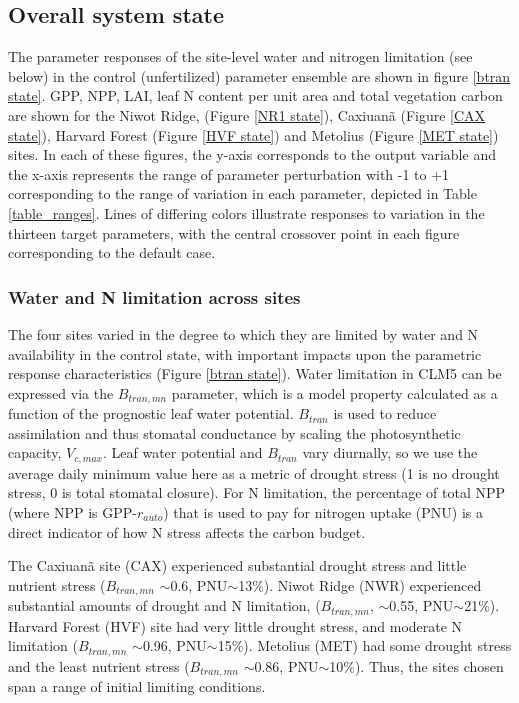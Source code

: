 \documentclass[draft,linenumbers]{agujournal}
\begin{document}
\subsection{Overall system state}
The parameter responses of the site-level water and nitrogen limitation (see below) in the control (unfertilized) parameter ensemble are shown in figure \ref{btran state}. GPP, NPP, LAI, leaf N content per unit area and total vegetation carbon are shown for the Niwot Ridge, (Figure \ref{NR1 state}), Caxiuan\~a (Figure \ref{CAX state}), Harvard Forest (Figure \ref{HVF state}) and Metolius (Figure \ref{MET state}) sites. In each of these figures, the y-axis corresponds to the output variable and the x-axis represents the range of parameter perturbation with -1 to +1 corresponding to the range of variation in each parameter, depicted in Table \ref{table_ranges}. Lines of differing colors illustrate responses to variation in the thirteen target parameters, with the central crossover point in each figure corresponding to the default case.

\subsubsection{Water and N limitation across sites}
The four sites varied in the degree to which they are limited by water and N availability in the control state, with important impacts upon the parametric response characteristics (Figure \ref{btran state}). Water limitation in CLM5 can be expressed via the $B_{tran,mn}$ parameter, which is a model property calculated as a function of the prognostic leaf water potential. $B_{tran}$  is used to reduce assimilation and thus stomatal conductance by scaling the photosynthetic capacity, $V_{c,max}$. Leaf water potential and  $B_{tran}$ vary diurnally, so we use the average daily minimum value here as a metric of drought stress (1 is no drought stress, 0 is total stomatal closure). For N limitation, the percentage of total NPP (where NPP is GPP-$r_{auto}$) that is used to pay for nitrogen uptake (PNU) is a direct indicator of how N stress affects the carbon budget. 

The Caxiuan\~a site (CAX) experienced substantial drought stress and little nutrient stress ($B_{tran,mn}$ $\sim$0.6, PNU$\sim$13\%). Niwot Ridge (NWR) experienced substantial amounts of drought and N limitation, ($B_{tran,mn}$, $\sim$0.55, PNU$\sim$21\%). Harvard Forest (HVF) site had very little drought stress, and moderate N limitation ($B_{tran,mn}$ $\sim$0.96, PNU$\sim$15\%).  Metolius (MET)  had some drought stress and the least nutrient stress ($B_{tran,mn}$ $\sim$0.86, PNU$\sim$10\%).  
Thus, the sites chosen span a range of initial limiting conditions.  
\end{document}
